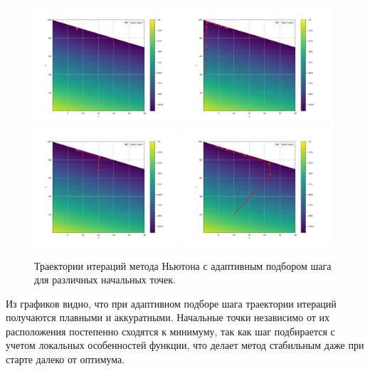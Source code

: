 \documentclass[a4paper,12pt]{article}
\begin{document}
\begin{figure}[H]
    \centering 
    \includegraphics[width=0.49\textwidth]{images/newton_adaptive_trajectory_0.png}
    \includegraphics[width=0.49\textwidth]{images/newton_adaptive_trajectory_1.png}
    \includegraphics[width=0.49\textwidth]{images/newton_adaptive_trajectory_2.png}
    \includegraphics[width=0.49\textwidth]{images/newton_adaptive_trajectory_3.png}
    \caption{Траектории итераций метода Ньютона с адаптивным подбором шага для различных начальных точек.}
  \end{figure}
\noindent Из графиков видно, что при адаптивном подборе шага траектории итераций получаются плавными и аккуратными. Начальные точки независимо от их расположения постепенно сходятся к минимуму, так как шаг подбирается с учетом локальных особенностей функции, что делает метод стабильным даже при старте далеко от оптимума.
\end{document}
